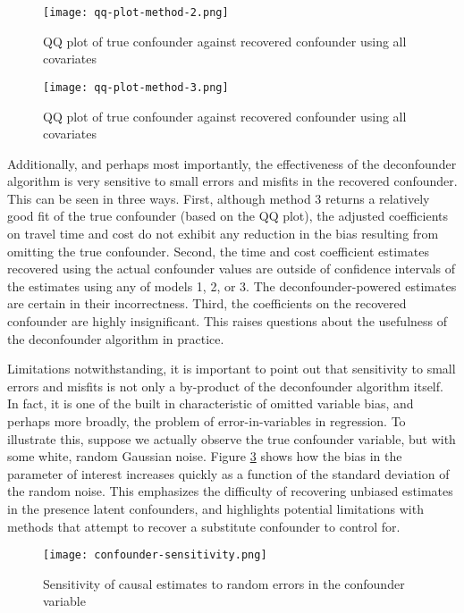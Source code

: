 \begin{figure}
   \centering
   \texttt{[image: qq-plot-method-2.png]}
   \caption{QQ plot of true confounder against recovered confounder using all covariates}
   \label{fig:qq-plot-method-2}
\end{figure}

\begin{figure}
   \centering
   \texttt{[image: qq-plot-method-3.png]}
   \caption{QQ plot of true confounder against recovered confounder using all covariates}
   \label{fig:qq-plot-method-3}
\end{figure}


Additionally, and perhaps most importantly, the effectiveness of the
deconfounder algorithm is very sensitive to small errors and misfits in the
recovered confounder.
This can be seen in three ways.
First, although method 3 returns a relatively good fit of the
true confounder (based on the QQ plot), the adjusted coefficients on travel
time and cost do not exhibit any reduction in the bias resulting from
omitting the true confounder.
Second, the time and cost coefficient estimates
recovered using the actual confounder values are outside of confidence intervals
of the estimates using any of models 1, 2, or 3.
The deconfounder-powered estimates are certain in their incorrectness.
Third, the coefficients on the recovered confounder are highly insignificant.
This raises questions about the usefulness of the deconfounder algorithm in practice.

Limitations notwithstanding, it is
important to point out that sensitivity to small errors and misfits is not only a by-product of the deconfounder
algorithm itself. In fact, it is one of the built in characteristic of omitted
variable bias, and perhaps more broadly, the problem of error-in-variables in
regression. To illustrate this, suppose we actually observe the true
confounder variable, but with some white, random Gaussian noise. Figure \ref{fig:confounder-sensitivity}
shows how the bias in the parameter of interest increases quickly as a
function of the standard deviation of the random noise. This emphasizes the
difficulty of recovering unbiased estimates in the presence latent confounders,
and highlights potential limitations with methods that attempt to recover a
substitute confounder to control for.

\begin{figure}
   \centering
   \texttt{[image: confounder-sensitivity.png]}
   \caption{Sensitivity of causal estimates to random errors in the confounder variable}
   \label{fig:confounder-sensitivity}
\end{figure}

